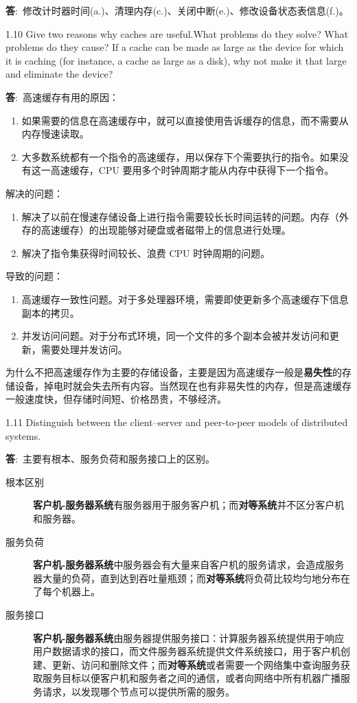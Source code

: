 \documentclass[12pt,a4paper]{article}
\newenvironment{problems}{\begin{list}{}{\renewcommand{\makelabel}[1]{\textbf{##1}\hfil}}}{\end{list}}
\providecommand{\ans}{\textbf{答}:~}
\begin{document}
\begin{problems}
    \ans 修改计时器时间(a.)、清理内存(c.)、关闭中断(e.)、修改设备状态表信息(f.)。
    \item[1.10] Give two reasons why caches are useful.What problems do they solve?
    What problems do they cause? If a cache can be made as large as the device for which it is caching (for instance, a cache as large as a disk),
    why not make it that large and eliminate the device?

    \ans 高速缓存有用的原因：
    \begin{enumerate}
        \item 如果需要的信息在高速缓存中，就可以直接使用告诉缓存的信息，而不需要从内存慢速读取。
        \item 大多数系统都有一个指令的高速缓存，用以保存下个需要执行的指令。如果没有这一高速缓存，CPU 要用多个时钟周期才能从内存中获得下一个指令。
    \end{enumerate}

    解决的问题：
    \begin{enumerate}
        \item 解决了以前在慢速存储设备上进行指令需要较长长时间运转的问题。内存（外存的高速缓存）的出现能够对硬盘或者磁带上的信息进行处理。
        \item 解决了指令集获得时间较长、浪费 CPU 时钟周期的问题。
    \end{enumerate}

    导致的问题：
    \begin{enumerate}
        \item 高速缓存一致性问题。对于多处理器环境，需要即使更新多个高速缓存下信息副本的拷贝。
        \item 并发访问问题。对于分布式环境，同一个文件的多个副本会被并发访问和更新，需要处理并发访问。
    \end{enumerate}

    为什么不把高速缓存作为主要的存储设备，主要是因为高速缓存一般是\textbf{易失性}的存储设备，掉电时就会失去所有内容。当然现在也有非易失性的内存，但是高速缓存一般速度快，但存储时间短、价格昂贵，不够经济。
    \item[1.11] Distinguish between the client–server and peer-to-peer models of distributed
    systems.

    \ans 主要有根本、服务负荷和服务接口上的区别。
    \begin{description}
        \item[根本区别] \textbf{客户机-服务器系统}有服务器用于服务客户机；而\textbf{对等系统}并不区分客户机和服务器。
        \item[服务负荷] \textbf{客户机-服务器系统}中服务器会有大量来自客户机的服务请求，会造成服务器大量的负荷，直到达到吞吐量瓶颈；而\textbf{对等系统}将负荷比较均匀地分布在了每个机器上。
        \item[服务接口] \textbf{客户机-服务器系统}由服务器提供服务接口：计算服务器系统提供用于响应用户数据请求的接口，而文件服务器系统提供文件系统接口，用于客户机创建、更新、访问和删除文件；而\textbf{对等系统}或者需要一个网络集中查询服务获取服务目标以便客户机和服务者之间的通信，或者向网络中所有机器广播服务请求，以发现哪个节点可以提供所需的服务。
    \end{description}
    

\end{problems}
\end{document}
